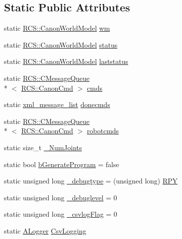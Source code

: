 \subsection*{Static Public Attributes}
\begin{DoxyCompactItemize}
\item 
static \hyperlink{structRCS_1_1CanonWorldModel}{R\-C\-S\-::\-Canon\-World\-Model} \hyperlink{structRCS_1_1CController_a2b5d355e3e9d6195943ab148c1f94083}{wm}
\item 
static \hyperlink{structRCS_1_1CanonWorldModel}{R\-C\-S\-::\-Canon\-World\-Model} \hyperlink{structRCS_1_1CController_a82e9cc233cd25554964efe8a9008e0b2}{status}
\item 
static \hyperlink{structRCS_1_1CanonWorldModel}{R\-C\-S\-::\-Canon\-World\-Model} \hyperlink{structRCS_1_1CController_af76ac9412dbefbaebc970d62f88a40fa}{laststatus}
\item 
static \hyperlink{classRCS_1_1CMessageQueue}{R\-C\-S\-::\-C\-Message\-Queue}\\*
$<$ \hyperlink{structRCS_1_1CanonCmd}{R\-C\-S\-::\-Canon\-Cmd} $>$ \hyperlink{structRCS_1_1CController_adceba05ebd7fa94f93c131db84840d29}{cmds}
\item 
static \hyperlink{structRCS_1_1CController_aeaee07d36d39b56ecad1ce2443b5b4c0}{xml\-\_\-message\-\_\-list} \hyperlink{structRCS_1_1CController_a093ccebe77526dc736b0ddff70dec0fc}{donecmds}
\item 
static \hyperlink{classRCS_1_1CMessageQueue}{R\-C\-S\-::\-C\-Message\-Queue}\\*
$<$ \hyperlink{structRCS_1_1CanonCmd}{R\-C\-S\-::\-Canon\-Cmd} $>$ \hyperlink{structRCS_1_1CController_aa96c7961737b7e1cf5d8b4180f4bc399}{robotcmds}
\item 
static size\-\_\-t \hyperlink{structRCS_1_1CController_a9b155c29a4fbb8b1a36dada1417126ff}{\-\_\-\-Num\-Joints}
\item 
static bool \hyperlink{structRCS_1_1CController_a5b5e83348fbf18e362a59a2d96668466}{b\-Generate\-Program} = false
\item 
static unsigned long \hyperlink{structRCS_1_1CController_ae4ff5cead0f30ebf8dcbc850b342afc4}{\-\_\-debugtype} = (unsigned long) \hyperlink{structRCS_1_1CController_ae1f342838100497b0b94108c6ec74915aa62b453d8d0e2b7bf2f8a22b9b650441}{R\-P\-Y}
\item 
static unsigned long \hyperlink{structRCS_1_1CController_a1e7f92c361c961fae03b08986bc19a16}{\-\_\-debuglevel} = 0
\item 
static unsigned long \hyperlink{structRCS_1_1CController_ab52a91aa3bfa1f56b527217f09c66912}{\-\_\-csvlog\-Flag} = 0
\item 
static \hyperlink{classALogger}{A\-Logger} \hyperlink{structRCS_1_1CController_a7e21b1156fe37407bae1ba468815206c}{Csv\-Logging}
\end{DoxyCompactItemize}
